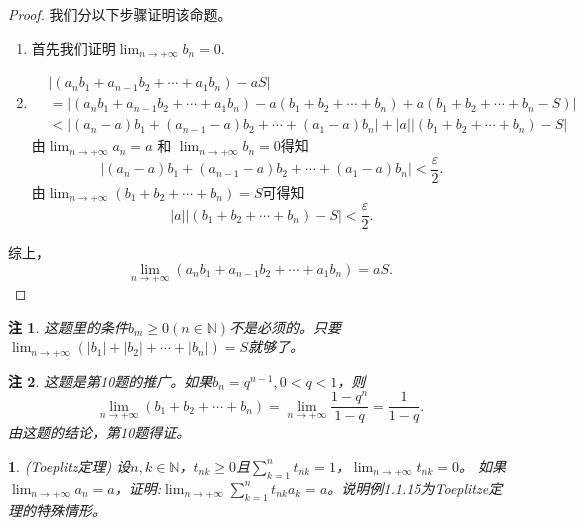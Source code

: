 \documentclass[utf8]{book}
\newtheorem{example}{}[section]             %
\newtheorem{remark}{注}
\begin{document}
\begin{proof}
我们分以下步骤证明该命题。
\begin{enumerate}
\renewcommand\labelenumi{\normalfont(\theenumi)}
\item 首先我们证明$\displaystyle \lim_{n\to +\infty}b_n = 0$.
\item 
\begin{equation*}
\begin{split}
&\left | (a_nb_1+a_{n-1}b_2+\cdots+a_1b_n) - aS \right | \\
&= \left | (a_nb_1+a_{n-1}b_2+\cdots+a_1b_n) - a(b_1+b_2+\cdots+b_n)+a(b_1+b_2+\cdots+b_n -S)\right| \\
&< \left | (a_n-a)b_1+(a_{n-1}-a)b_2+\cdots+(a_1-a)b_n\right| + \left|a\right|\left|(b_1 + b_2+\cdots + b_n) -S\right|
\end{split}
\end{equation*}
由$\displaystyle \lim_{n\to +\infty}a_n = a$ 和 $\displaystyle \lim_{n\to +\infty}b_n = 0$得知
$$\left | (a_n-a)b_1+(a_{n-1}-a)b_2+\cdots+(a_1-a)b_n\right| < \frac{\varepsilon}{2}.$$
由$\displaystyle \lim_{n\to +\infty}(b_1+b_2+\cdots+b_n) = S$可得知
$$\left|a\right|\left|(b_1 + b_2+\cdots + b_n) -S\right| < \frac{\varepsilon}{2}.$$
\end{enumerate}
综上，$$\displaystyle \lim_{n\to +\infty}(a_nb_1+a_{n-1}b_2+\cdots+a_1b_n) = aS.$$
\end{proof}
\begin{remark}
这题里的条件$b_m \geq 0 (n\in\mathbb{N})$不是必须的。只要$\displaystyle \lim_{n\to +\infty}(|b_1|+|b_2|+\cdots+|b_n|) = S$就够了。
\end{remark}
\begin{remark}
这题是第10题的推广。如果$b_n = q^{n-1}, 0 < q < 1$，则
$$\displaystyle \lim_{n\to +\infty}(b_1 + b_2 + \cdots + b_n) = \lim_{n\to +\infty}\frac{1-q^n}{1-q}=\frac{1}{1-q}.$$ 
由这题的结论，第10题得证。
\end{remark}
\begin{example}
(Toeplitz定理) 设$n,k\in\mathbb{N}$，$t_{nk} \geq 0$且$\displaystyle\sum_{k=1}^nt_{nk}=1$，$\displaystyle \lim_{n\to +\infty}t_{nk} = 0$。
如果$\displaystyle \lim_{n\to +\infty}a_n = a$，证明:$\displaystyle \lim_{n\to +\infty}\sum_{k=1}^nt_{nk}a_k = a$。说明例1.1.15为Toeplitze定理的特殊情形。
\end{example}
\end{document}

